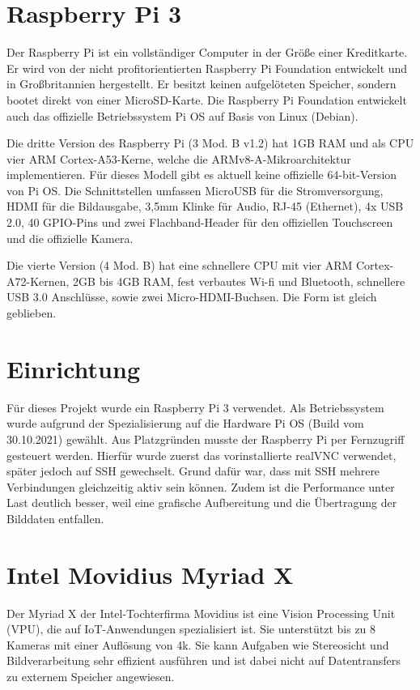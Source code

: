 %
%     
        
    


\section{Raspberry Pi 3}
Der Raspberry Pi ist ein vollständiger Computer in der Größe einer Kreditkarte. Er wird von der nicht profitorientierten Raspberry Pi Foundation entwickelt und in Großbritannien hergestellt. Er besitzt keinen aufgelöteten Speicher, sondern bootet direkt von einer MicroSD-Karte. Die Raspberry Pi Foundation entwickelt auch das offizielle Betriebssystem Pi OS auf Basis von Linux (Debian).

Die dritte Version des Raspberry Pi (3 Mod. B v1.2) hat 1GB RAM und als CPU vier ARM Cortex-A53-Kerne, welche die ARMv8-A-Mikroarchitektur implementieren. Für dieses Modell gibt es aktuell keine offizielle 64-bit-Version von Pi OS.
Die Schnittstellen umfassen MicroUSB für die Stromversorgung, HDMI für die Bildausgabe, 3,5mm Klinke für Audio, RJ-45 (Ethernet), 4x USB 2.0, 40 GPIO-Pins und zwei Flachband-Header für den offiziellen Touchscreen und die offizielle Kamera. \autocite{RaspberryPi1}

Die vierte Version (4 Mod. B) hat eine schnellere CPU mit vier ARM Cortex-A72-Kernen, 2GB bis 4GB RAM, fest verbautes Wi-fi und Bluetooth, schnellere USB 3.0 Anschlüsse, sowie zwei Micro-HDMI-Buchsen. Die Form ist gleich geblieben. \autocite{RaspberryPi2}

\section{Einrichtung}
Für dieses Projekt wurde ein Raspberry Pi 3 verwendet. Als Betriebssystem wurde aufgrund der Spezialisierung auf die Hardware Pi OS (Build vom 30.10.2021) gewählt. Aus Platzgründen musste der Raspberry Pi per Fernzugriff gesteuert werden. Hierfür wurde zuerst das vorinstallierte realVNC verwendet, später jedoch auf SSH gewechselt. Grund dafür war, dass mit SSH mehrere Verbindungen gleichzeitig aktiv sein können. Zudem ist die Performance unter Last deutlich besser, weil eine grafische Aufbereitung und die Übertragung der Bilddaten entfallen. 

\section{Intel Movidius Myriad X}
Der Myriad X der Intel-Tochterfirma Movidius ist eine Vision Processing Unit (VPU), die auf IoT-Anwendungen spezialisiert ist. Sie unterstützt bis zu 8 Kameras mit einer Auflösung von 4k. Sie kann Aufgaben wie Stereosicht und Bildverarbeitung sehr effizient ausführen und ist dabei nicht auf Datentransfers zu externem Speicher angewiesen.

